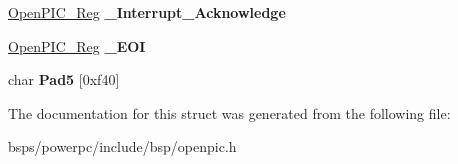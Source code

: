 \begin{DoxyCompactItemize}
\mbox{\label{struct__OpenPIC__Processor_a4552ca9ca219f8d8e37b2e5018a364ee}} 
\mbox{\hyperlink{struct__OpenPIC__Reg}{Open\+P\+I\+C\+\_\+\+Reg}} {\bfseries \+\_\+\+Interrupt\+\_\+\+Acknowledge}
\item 
\mbox{\label{struct__OpenPIC__Processor_a7715ea6135c85cc9306674905990a18f}} 
\mbox{\hyperlink{struct__OpenPIC__Reg}{Open\+P\+I\+C\+\_\+\+Reg}} {\bfseries \+\_\+\+E\+OI}
\item 
\mbox{\label{struct__OpenPIC__Processor_a4518b6a65898218272df359604f00b2e}} 
char {\bfseries Pad5} \mbox{[}0xf40\mbox{]}
\end{DoxyCompactItemize}


The documentation for this struct was generated from the following file\+:\begin{DoxyCompactItemize}
\item 
bsps/powerpc/include/bsp/openpic.\+h\end{DoxyCompactItemize}
